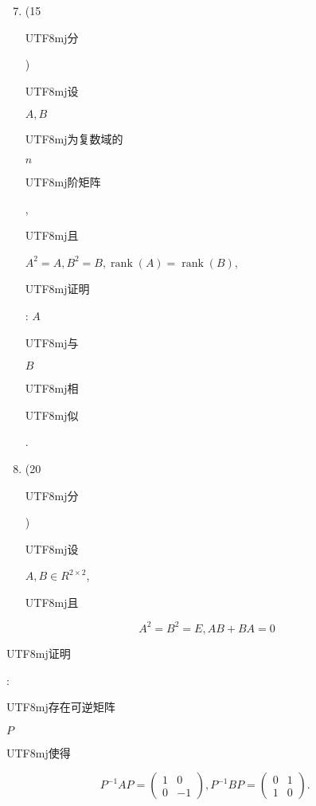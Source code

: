 \documentclass[10pt]{article}
\begin{document}
\begin{enumerate}
  \setcounter{enumi}{6}
  \item (15 \begin{CJK}{UTF8}{mj}分\end{CJK}) \begin{CJK}{UTF8}{mj}设\end{CJK} $A, B$ \begin{CJK}{UTF8}{mj}为复数域的\end{CJK} $n$ \begin{CJK}{UTF8}{mj}阶矩阵\end{CJK}, \begin{CJK}{UTF8}{mj}且\end{CJK} $A^{2}=A, B^{2}=B, \operatorname{rank}(A)=\operatorname{rank}(B)$, \begin{CJK}{UTF8}{mj}证明\end{CJK}: $A$ \begin{CJK}{UTF8}{mj}与\end{CJK} $B$ \begin{CJK}{UTF8}{mj}相\end{CJK} \begin{CJK}{UTF8}{mj}似\end{CJK}.

  \item (20 \begin{CJK}{UTF8}{mj}分\end{CJK}) \begin{CJK}{UTF8}{mj}设\end{CJK} $A, B \in R^{2 \times 2}$, \begin{CJK}{UTF8}{mj}且\end{CJK}

\end{enumerate}
$$
A^{2}=B^{2}=E, A B+B A=0
$$
\begin{CJK}{UTF8}{mj}证明\end{CJK}: \begin{CJK}{UTF8}{mj}存在可逆矩阵\end{CJK} $P$ \begin{CJK}{UTF8}{mj}使得\end{CJK}
$$
P^{-1} A P=\left(\begin{array}{cc}
1 & 0 \\
0 & -1
\end{array}\right), P^{-1} B P=\left(\begin{array}{ll}
0 & 1 \\
1 & 0
\end{array}\right) \text {. }
$$
\end{document}
